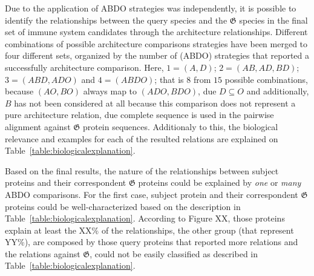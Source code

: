 \documentclass[11pt]{article}
\begin{document}
Due to the application of ABDO strategies was independently, it is possible to 
identify the relationships between the query species and the 
$\boldsymbol{\mathfrak{G}}$ species in the final set of immune system 
candidates through the architecture relationships. Different combinations of 
possible architecture comparisons strategies have been merged to four different 
sets, organized by the number of (ABDO) strategies that reported a successfully
architecture comparison. Here, $1 = (A, D)$; $2 = (AB, AD, BD)$; $3 = (ABD, ADO)$ 
and $4 = (ABDO)$; that is $8$ from $15$ possible combinations, because $ (AO, 
BO)$ always map to $ (ADO, BDO)$, due $D \subseteq O$ and additionally, $B$ has 
not been considered at all because this comparison does not represent a pure 
architecture relation, due complete sequence is used in the pairwise alignment 
against $\boldsymbol{\mathfrak{G}}$ protein sequences. Additionaly to this,
the biological relevance and examples for each of the resulted relations are
explained on Table~\ref{table:biologicalexplanation}.

Based on the final results, the nature of the relationships between subject 
proteins and their correspondent $\boldsymbol{\mathfrak{G}}$ proteins could be explained 
by \textit{one} or \textit{many} ABDO comparisons. For the first case, subject protein
and their correspondent $\boldsymbol{\mathfrak{G}}$ proteins could be well-characterized based
on the description in Table~\ref{table:biologicalexplanation}. According to Figure XX, those
proteins explain at least the XX\% of the relationships, the other group (that represent YY\%),
are composed by those query proteins that reported more relations and the relations against
$\boldsymbol{\mathfrak{G}}$, could not be easily classified as described in
Table~\ref{table:biologicalexplanation}. 
\end{document}
